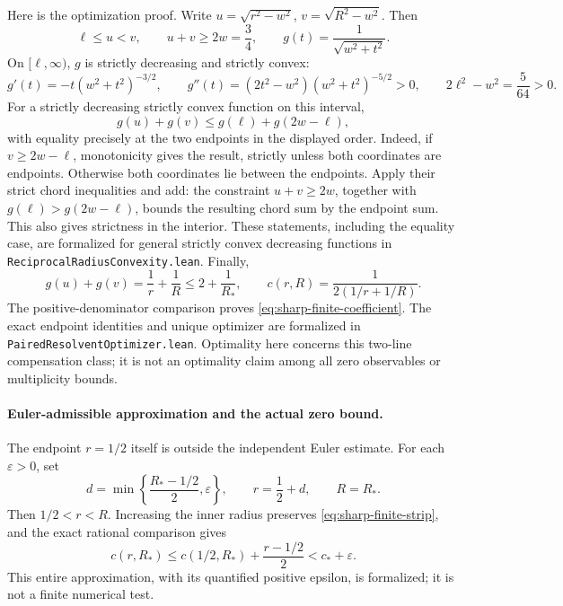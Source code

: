 Here is the optimization proof. Write
\(u=\sqrt{r^2-w^2}\), \(v=\sqrt{R^2-w^2}\). Then
\[
 \ell\le u<v,\qquad u+v\ge2w=\frac34,
 \qquad g(t)=\frac1{\sqrt{w^2+t^2}}.
\]
On \([\ell,\infty)\), \(g\) is strictly decreasing and strictly convex:
\[
 g'(t)=-t(w^2+t^2)^{-3/2},\qquad
 g''(t)=(2t^2-w^2)(w^2+t^2)^{-5/2}>0,
 \qquad 2\ell^2-w^2=\frac5{64}>0.
\]
For a strictly decreasing strictly convex function on this interval,
\[
 g(u)+g(v)\le g(\ell)+g(2w-\ell),
\]
with equality precisely at the two endpoints in the displayed order.
Indeed, if \(v\ge2w-\ell\), monotonicity gives the result, strictly
unless both coordinates are endpoints. Otherwise both coordinates
lie between the endpoints. Apply their strict chord inequalities and
add: the constraint \(u+v\ge2w\), together with
\(g(\ell)>g(2w-\ell)\), bounds the resulting chord sum by the endpoint
sum. This also gives strictness in the interior. These statements,
including the equality case, are formalized for general strictly
convex decreasing functions in \texttt{ReciprocalRadiusConvexity.lean}.
Finally,
\[
 g(u)+g(v)=\frac1r+\frac1R
 \le 2+\frac1{R_*},\qquad
 c(r,R)=\frac1{2(1/r+1/R)}.
\]
The positive-denominator comparison proves
\eqref{eq:sharp-finite-coefficient}. The exact endpoint identities and
unique optimizer are formalized in \texttt{PairedResolventOptimizer.lean}.
Optimality here concerns this two-line compensation class; it is not
an optimality claim among all zero observables or multiplicity bounds.

\paragraph{Euler-admissible approximation and the actual zero bound.}
The endpoint \(r=1/2\) itself is outside the independent Euler estimate.
For each \(\varepsilon>0\), set
\[
 d=\min\left\{\frac{R_*-1/2}{2},\varepsilon\right\},\qquad
 r=\frac12+d,\qquad R=R_*.
\]
Then \(1/2<r<R\). Increasing the inner radius preserves
\eqref{eq:sharp-finite-strip}, and the exact rational comparison gives
\[
 c(r,R_*)\le c(1/2,R_*)+\frac{r-1/2}{2}<c_*+\varepsilon.
\]
This entire approximation, with its quantified positive epsilon,
is formalized; it is not a finite numerical test.

